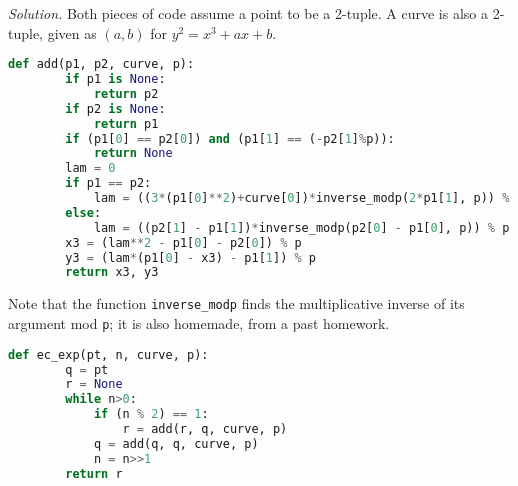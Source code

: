 \documentclass{amsart}
\begin{document}
	\textit{Solution.}
	Both pieces of code assume a point to be a 2-tuple. A curve is also a 2-tuple, given as $(a, b)$ for $y^2 = x^3 + ax + b$.
	
	\begin{lstlisting}[language=Python]
    def add(p1, p2, curve, p):
        if p1 is None:
            return p2
        if p2 is None:
            return p1
        if (p1[0] == p2[0]) and (p1[1] == (-p2[1]%p)):
            return None
        lam = 0
        if p1 == p2:
            lam = ((3*(p1[0]**2)+curve[0])*inverse_modp(2*p1[1], p)) % p
        else:
            lam = ((p2[1] - p1[1])*inverse_modp(p2[0] - p1[0], p)) % p
        x3 = (lam**2 - p1[0] - p2[0]) % p
        y3 = (lam*(p1[0] - x3) - p1[1]) % p
        return x3, y3
	\end{lstlisting}
	
	Note that the function \texttt{inverse\_modp} finds the multiplicative inverse of its argument mod \texttt{p}; it is also homemade, from a past homework.
	
	\begin{lstlisting}[language=Python]
    def ec_exp(pt, n, curve, p):
        q = pt
        r = None
        while n>0:
            if (n % 2) == 1:
                r = add(r, q, curve, p)
            q = add(q, q, curve, p)
            n = n>>1
        return r
	\end{lstlisting}
	
	
	
	
	
	
	
	
	
	
	
	
	
\end{document}
